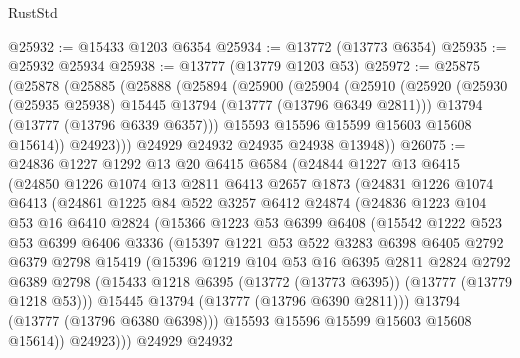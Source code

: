 \begin{lexlean}{RustStd}
\begin{coremodule}
@25932 := @15433 @1203 @6354
@25934 := @13772 (@13773 @6354)
@25935 := @25932 @25934
@25938 := @13777 (@13779 @1203 @53)
@25972 := @25875
    (@25878
      (@25885
        (@25888
          (@25894
            (@25900
              (@25904
                (@25910
                  (@25920
                    (@25930 (@25935 @25938) @15445 @13794 (@13777 (@13796 @6349 @2811)))
                    @13794
                    (@13777 (@13796 @6339 @6357)))
                  @15593
                  @15596
                  @15599
                  @15603
                  @15608
                  @15614))
              @24923)))
        @24929
        @24932
        @24935
        @24938
        @13948))
@26075 := @24836
    @1227
    @1292
    @13
    @20
    @6415
    @6584
    (@24844
      @1227
      @13
      @6415
      (@24850
        @1226
        @1074
        @13
        @2811
        @6413
        @2657
        @1873
        (@24831
          @1226
          @1074
          @6413
          (@24861
            @1225
            @84
            @522
            @3257
            @6412
            @24874
            (@24836
              @1223
              @104
              @53
              @16
              @6410
              @2824
              (@15366
                @1223
                @53
                @6399
                @6408
                (@15542
                  @1222
                  @523
                  @53
                  @6399
                  @6406
                  @3336
                  (@15397
                    @1221
                    @53
                    @522
                    @3283
                    @6398
                    @6405
                    @2792
                    @6379
                    @2798
                    @15419
                    (@15396
                      @1219
                      @104
                      @53
                      @16
                      @6395
                      @2811
                      @2824
                      @2792
                      @6389
                      @2798
                      (@15433 @1218 @6395 (@13772 (@13773 @6395)) (@13777 (@13779 @1218 @53)))
                      @15445
                      @13794
                      (@13777 (@13796 @6390 @2811)))
                    @13794
                    (@13777 (@13796 @6380 @6398)))
                  @15593
                  @15596
                  @15599
                  @15603
                  @15608
                  @15614))
              @24923)))
        @24929
        @24932

\end{coremodule}
\end{lexlean}
